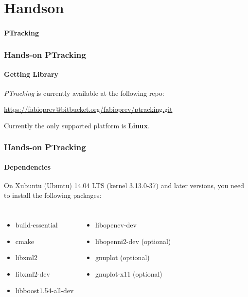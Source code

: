 \section{Handson}

\begin{frame}
	\frametitle{}
	
	\Huge
	
	\vspace{0.5cm}
	
	\begin{center}
		\textbf{PTracking}
	\end{center}
\end{frame}

\begin{frame}
	\frametitle{Hands-on PTracking}
	\framesubtitle{Getting Library}
	
	\Large
	
	\emph{PTracking} is currently available at the following repo:
	\begin{center}
		\url{https://fabioprev@bitbucket.org/fabioprev/ptracking.git}
	\end{center}
	
	\vspace{0.2cm}
	
	Currently the only supported platform is \textbf{Linux}.
\end{frame}

\begin{frame}
	\frametitle{Hands-on PTracking}
	\framesubtitle{Dependencies}
	
	\Large
	
	On Xubuntu (Ubuntu) 14.04 LTS (kernel 3.13.0-37) and later versions, you need to install
	the following packages:
	
	\vspace{0.2cm}
	
	\begin{columns}[T]
		
		\begin{itemize}
			\item build-essential
			\item cmake
			\item libxml2
			\item libxml2-dev
			\item libboost1.54-all-dev
		\end{itemize}
		
		\centering
		
		\begin{itemize}
			\item libopencv-dev
			\item libopenni2-dev (optional)
			\item gnuplot (optional)
			\item gnuplot-x11 (optional)
		\end{itemize}
	\end{columns}
\end{frame}


